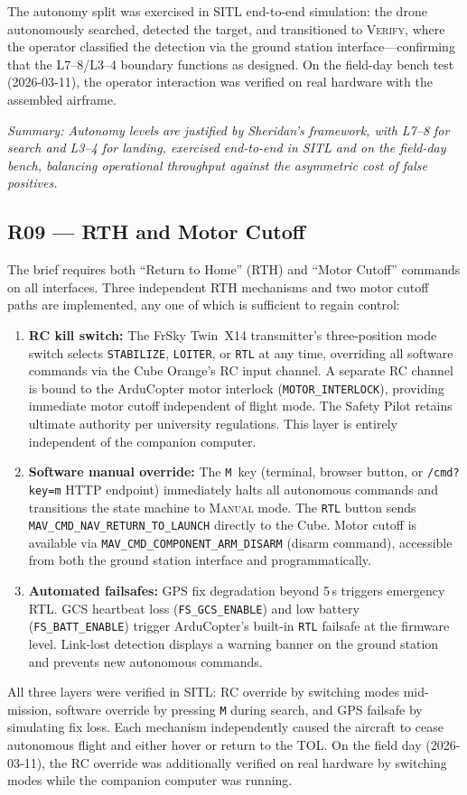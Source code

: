 The autonomy split was exercised in SITL end-to-end simulation: the drone autonomously searched, detected the target, and transitioned to \textsc{Verify}, where the operator classified the detection via the ground station interface---confirming that the L7--8/L3--4 boundary functions as designed. On the field-day bench test (2026-03-11), the operator interaction was verified on real hardware with the assembled airframe.

\noindent\textit{Summary: Autonomy levels are justified by Sheridan's framework, with L7--8 for search and L3--4 for landing, exercised end-to-end in SITL and on the field-day bench, balancing operational throughput against the asymmetric cost of false positives.}

\subsection{R09 --- RTH and Motor Cutoff}

The brief requires both ``Return to Home'' (RTH) and ``Motor Cutoff'' commands on all interfaces. Three independent RTH mechanisms and two motor cutoff paths are implemented, any one of which is sufficient to regain control:
\begin{enumerate}
    \item \textbf{RC kill switch:} The FrSky Twin~X14 transmitter's three-position mode switch selects \texttt{STABILIZE}, \texttt{LOITER}, or \texttt{RTL} at any time, overriding all software commands via the Cube Orange's RC input channel. A separate RC channel is bound to the ArduCopter motor interlock (\texttt{MOTOR\_INTERLOCK}), providing immediate motor cutoff independent of flight mode. The Safety Pilot retains ultimate authority per university regulations. This layer is entirely independent of the companion computer.
    \item \textbf{Software manual override:} The \texttt{M}~key (terminal, browser button, or \texttt{/cmd?key=m} HTTP endpoint) immediately halts all autonomous commands and transitions the state machine to \textsc{Manual} mode. The \texttt{RTL} button sends \texttt{MAV\_CMD\_NAV\_RETURN\_TO\_LAUNCH} directly to the Cube. Motor cutoff is available via \texttt{MAV\_CMD\_COMPONENT\_ARM\_DISARM} (disarm command), accessible from both the ground station interface and programmatically.
    \item \textbf{Automated failsafes:} GPS fix degradation beyond 5\,s triggers emergency RTL. GCS heartbeat loss (\texttt{FS\_GCS\_ENABLE}) and low battery (\texttt{FS\_BATT\_ENABLE}) trigger ArduCopter's built-in \texttt{RTL} failsafe at the firmware level. Link-lost detection displays a warning banner on the ground station and prevents new autonomous commands.
\end{enumerate}
All three layers were verified in SITL: RC override by switching modes mid-mission, software override by pressing \texttt{M} during search, and GPS failsafe by simulating fix loss. Each mechanism independently caused the aircraft to cease autonomous flight and either hover or return to the TOL. On the field day (2026-03-11), the RC override was additionally verified on real hardware by switching modes while the companion computer was running.

